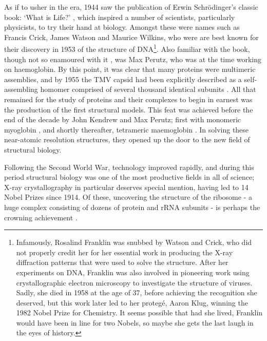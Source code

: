 \documentclass[a4paper,11pt,twoside,openright]{scrbook}
\begin{document}
As if to usher in the era, 1944 saw the publication of Erwin Schrödinger's classic book: `What is Life?' \cite{Schrodinger1947}, which inspired a number of scientists, particularly physicists, to try their hand at biology. Amongst these were names such as Francis Crick, James Watson and Maurice Wilkins, who were are best known for their discovery in 1953 of the structure of DNA\footnote{Infamously, Rosalind Franklin was snubbed by Watson and Crick, who did not properly credit her for her essential work in producing the X-ray diffraction patterns that were used to solve the structure. After her experiments on DNA, Franklin was also involved in pioneering work using crystallographic electron microscopy to investigate the structure of viruses. Sadly, she died in 1958 at the age of 37, before achieving the recognition she deserved, but this work later led to her protegé, Aaron Klug, winning the 1982 Nobel Prize for Chemistry. It seems possible that had she lived, Franklin would have been in line for two Nobels, so maybe she gets the last laugh in the eyes of history.}. Also familiar with the book, though not so enamoured with it \cite{Dronamraju1999}, was Max Perutz, who was at the time working on haemoglobin. By this point, it was clear that many proteins were multimeric assemblies, and by 1955 the TMV capsid had been explicitly described as a self-assembling homomer comprised of several thousand identical subunits \cite{Fraenkel-Conrat1955}. All that remained for the study of proteins and their complexes to begin in earnest was the production of the first structural models. This feat was achieved before the end of the decade by John Kendrew and Max Perutz; first with monomeric myoglobin \cite{Kendrew1958}, and shortly thereafter, tetrameric maemoglobin \cite{Perutz1960}. In solving these near-atomic resolution structures, they opened up the door to the new field of structural biology.

Following the Second World War, technology improved rapidly, and during this period structural biology was one of the most productive fields in all of science; X-ray crystallography in particular deserves special mention, having led to 14 Nobel Prizes since 1914. Of these, uncovering the structure of the ribosome - a huge complex consisting of dozens of protein and rRNA subunits - is perhaps the crowning achievement \cite{Schluenzen2000,Ramakrishnan2000,Ban2000}.
\end{document}
